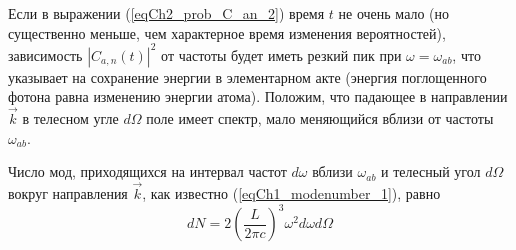Если в выражении (\ref{eqCh2_prob_C_an_2}) время $t$ не очень мало (но
существенно меньше, чем характерное время изменения вероятностей),
зависимость $\left|C_{a,n}\left(t\right)\right|^2$ от частоты будет
иметь резкий пик при $\omega = \omega_{ab}$,  что указывает на
сохранение энергии в элементарном акте (энергия поглощенного фотона
равна изменению энергии атома). Положим, что падающее в направлении
$\vec{k}$ в телесном угле $d \Omega$ поле имеет спектр, мало
меняющийся вблизи от частоты $\omega_{ab}$. 
 
Число мод, приходящихся на интервал частот $d \omega$  вблизи
$\omega_{ab}$ и телесный угол $d \Omega$  вокруг направления
$\vec{k}$,  как известно (\ref{eqCh1_modenumber_1}), равно
\begin{equation}
d N = 2 \left(\frac{L}{2 \pi c} \right)^3 \omega^2 d \omega d \Omega
\end{equation}

